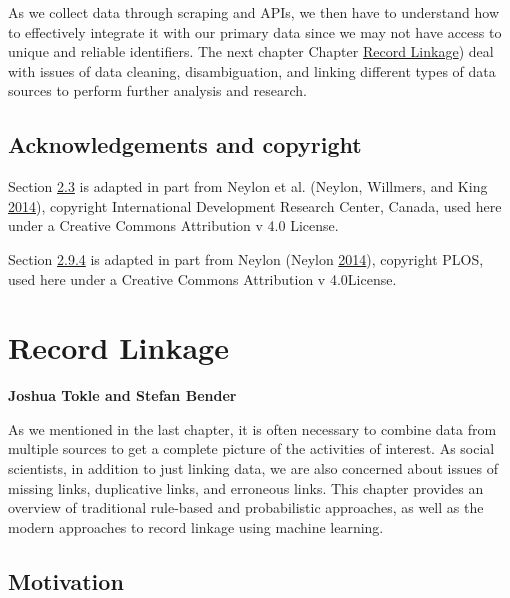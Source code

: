 \documentclass[]{krantz}
\begin{document}
As we collect data through scraping and APIs, we then have to understand
how to effectively integrate it with our primary data since we may not
have access to unique and reliable identifiers. The next chapter Chapter
\protect\hyperlink{chap:link}{Record Linkage}) deal with issues of data
cleaning, disambiguation, and linking different types of data sources to
perform further analysis and research.

\section{Acknowledgements and
copyright}\label{acknowledgements-and-copyright}

Section \protect\hyperlink{sec:4-2}{2.3} is adapted in part from Neylon
et al. (Neylon, Willmers, and King
\protect\hyperlink{ref-neylon2014scap}{2014}), copyright International
Development Research Center, Canada, used here under a Creative Commons
Attribution v 4.0 License.

Section \protect\hyperlink{sec:4-7.1.4}{2.9.4} is adapted in part from
Neylon (Neylon \protect\hyperlink{ref-neylon2014plosaltmetrics}{2014}),
copyright PLOS, used here under a Creative Commons Attribution v
4.0License.

\hypertarget{chap:link}{\chapter{Record Linkage}\label{chap:link}}

\textbf{Joshua Tokle and Stefan Bender}

As we mentioned in the last chapter, it is often necessary to combine
data from multiple sources to get a complete picture of the activities
of interest. As social scientists, in addition to just linking data, we
are also concerned about issues of missing links, duplicative links, and
erroneous links. This chapter provides an overview of traditional
rule-based and probabilistic approaches, as well as the modern
approaches to record linkage using machine learning.

\section{Motivation}\label{motivation}
\end{document}
